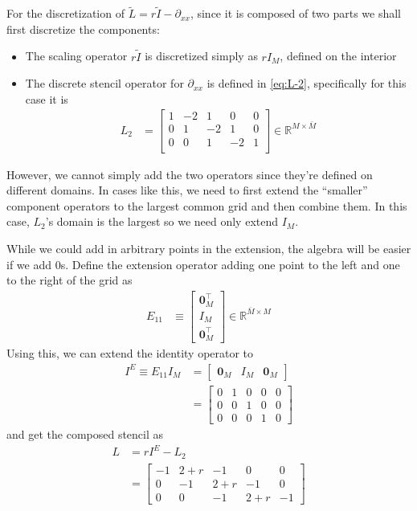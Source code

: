 \documentclass[11pt]{article}
\newcommand{\R}{\ensuremath{\mathbb{R}}}
\newcommand{\D}[1][]{\ensuremath{\partial_{#1}}}
\begin{document}
For the discretization of $\tilde{L} = r\tilde{I} - \D[xx]$, since it is composed of two parts we shall first discretize the components:
\begin{itemize}
	\item The scaling operator $r\tilde{I}$ is discretized simply as $rI_M$, defined on the interior
	\item The discrete stencil operator for $\D[xx]$ is defined in \cref{eq:L-2}, specifically for this case it is
	\begin{align}
		L_2 &= \begin{bmatrix}
			1 & -2 & 1 & 0 & 0\\
			0 & 1 & -2 & 1 & 0\\	
			0 & 0 & 1 & -2 & 1\\	
			\end{bmatrix}\in \R^{M \times \bar{M}}
	\end{align}
\end{itemize}

However, we cannot simply add the two operators since they're defined on different domains. In cases like this, we need to first extend the ``smaller'' component operators to the largest common grid and then combine them. In this case, $L_2$'s domain is the largest so we need only extend $I_M$.

While we could add in arbitrary points in the extension, the algebra will be easier if we add $0$s. Define the extension operator adding one point to the left and one to the right of the grid as
\begin{align}
	E_{11} &\equiv \begin{bmatrix}
						\textbf{0}_M^{\top}\\ 
						I_M\\
						\textbf{0}_M^{\top}
					\end{bmatrix}\in\R^{\bar{M} \times M}
\end{align}
Using this, we can extend the identity operator to
\begin{align}
	I^E \equiv E_{11}I_M &= \begin{bmatrix} \textbf{0}_M & I_M & \textbf{0}_M\end{bmatrix}\\
		&= \begin{bmatrix}
				0 & 1 & 0 & 0 & 0\\
				0 & 0 & 1 & 0 & 0\\
				0 & 0 & 0 & 1 & 0
			\end{bmatrix}
\end{align}
and get the composed stencil as
\begin{align}
	L &= rI^E - L_2\\
	  &= \begin{bmatrix}
			-1 & 2 + r & -1 & 0 & 0\\
			0 & -1 & 2+r & -1 & 0\\
			0 & 0 & -1 & 2+r & -1
	  	\end{bmatrix}\label{eq:L-example1}
\end{align}
\end{document}
